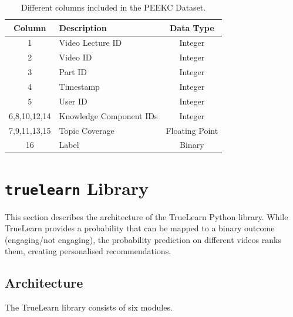\documentclass[letterpaper]{article} %
\begin{document}
\begin{table}[] \small
\caption{Different columns included in the PEEKC Dataset.}
\label{tab:features}
\centering
\begin{tabular}{clc}
\hline
Column & Description & Data Type\\
\hline
1 & Video Lecture ID & Integer\\
2 & Video ID & Integer \\
3 & Part ID & Integer\\
4 & Timestamp & Integer \\
5 & User ID & Integer \\
6,8,10,12,14 & Knowledge Component IDs & Integer\\
7,9,11,13,15 & Topic Coverage & Floating Point\\
16 & Label & Binary\\
\hline
\end{tabular}
\end{table}


\section{\texttt{truelearn} Library}

This section describes the architecture of the TrueLearn Python library. While TrueLearn provides a probability that can be mapped to a binary outcome (engaging/not engaging), the probability prediction on different videos ranks them, creating personalised recommendations.





\subsection{Architecture}

The TrueLearn library consists of six modules.
\end{document}
